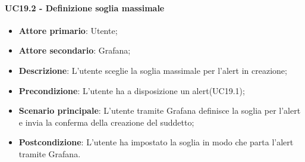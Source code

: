 \paragraph{UC19.2 - Definizione soglia massimale}
\label{para:uc19.2}
\begin{itemize}
  \item \textbf{Attore primario}: Utente;
  \item \textbf{Attore secondario}: Grafana;
  \item \textbf{Descrizione}: L'utente sceglie la soglia massimale per l'alert in creazione;
  \item \textbf{Precondizione}: L'utente ha a disposizione un alert(UC19.1);
  \item \textbf{Scenario principale}: L'utente tramite Grafana definisce la soglia per l'alert e invia la conferma della creazione del suddetto;
  \item \textbf{Postcondizione}: L'utente ha impostato la soglia in modo che parta l'alert tramite Grafana.
\end{itemize}
